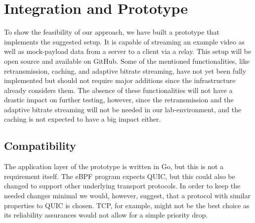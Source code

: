 \section{Integration and Prototype}\label{sec:integration_and_prototype}

To show the feasibility of our approach, we have built a prototype 
that implements the suggested setup.
It is capable of streaming an example video as well as mock-payload data from 
a server to a client via a relay.
This setup will be open source and available on GitHub.
Some of the mentioned functionalities, like retransmission, caching, and adaptive
bitrate streaming, have not yet been fully implemented but should not require major
additions since the infrastructure already considers them.
The absence of these functionalities will not have a drastic impact on further 
testing, however, since the retransmission and the adaptive bitrate streaming will not
be needed in our lab-environment, and the caching is not expected to have a big impact
either.

\subsection{Compatibility}
The application layer of the prototype is written in Go, but this is not a requirement
itself.
The eBPF program expects QUIC, but this could also be changed to support other underlying 
transport protocols.
In order to keep the needed changes minimal we would, however, suggest, that a protocol
with similar properties to QUIC is chosen.
TCP, for example, might not be the best choice as its reliability assurances would not 
allow for a simple priority drop.

